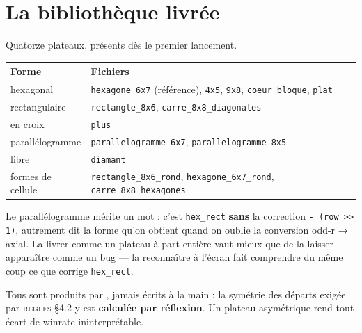 \section{La bibliothèque livrée}

Quatorze plateaux, présents dès le premier lancement.

\begin{center}
\begin{tabular}{@{}p{3.6cm}p{10.2cm}@{}}
\toprule
\textbf{Forme} & \textbf{Fichiers} \\
\midrule
hexagonal & \texttt{hexagone\_6x7} (référence), \texttt{4x5}, \texttt{9x8}, \texttt{coeur\_bloque}, \texttt{plat} \\
rectangulaire & \texttt{rectangle\_8x6}, \texttt{carre\_8x8\_diagonales} \\
en croix & \texttt{plus} \\
parallélogramme & \texttt{parallelogramme\_6x7}, \texttt{parallelogramme\_8x5} \\
libre & \texttt{diamant} \\
formes de cellule & \texttt{rectangle\_8x6\_rond}, \texttt{hexagone\_6x7\_rond}, \texttt{carre\_8x8\_hexagones} \\
\bottomrule
\end{tabular}
\end{center}

Le parallélogramme mérite un mot : c'est \texttt{hex\_rect} \textbf{sans} la
correction \texttt{- (row >> 1)}, autrement dit la forme qu'on obtient quand on
oublie la conversion odd-r → axial. La livrer comme un plateau à part entière
vaut mieux que de la laisser apparaître comme un bug — la reconnaître à l'écran
fait comprendre du même coup ce que corrige \texttt{hex\_rect}.

Tous sont produits par , jamais écrits à la main : la
symétrie des départs exigée par \textsc{regles §4.2} y est \textbf{calculée par
réflexion}. Un plateau asymétrique rend tout écart de winrate ininterprétable.
